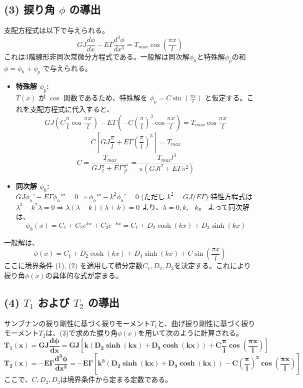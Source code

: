 \documentclass[a4j,12pt]{jsarticle}
\begin{document}
\subsection*{(3) 捩り角 $\phi$ の導出}
支配方程式は以下で与えられる。
$$GJ\frac{d\phi}{dx} - E\Gamma\frac{d^3\phi}{dx^3} = T_{max} \cos\left(\frac{\pi x}{l}\right)$$
これは3階線形非同次常微分方程式である。一般解は同次解$\phi_h$と特殊解$\phi_p$の和 $\phi = \phi_h + \phi_p$ で与えられる。
\begin{itemize}
    \item \textbf{特殊解 $\phi_p$:} \\
    $T(x)$ が $\cos$ 関数であるため、特殊解を $\phi_p = C \sin\left(\frac{\pi x}{l}\right)$ と仮定する。これを支配方程式に代入すると、
    $$GJ \left(C\frac{\pi}{l}\cos\frac{\pi x}{l}\right) - E\Gamma \left(-C\left(\frac{\pi}{l}\right)^3\cos\frac{\pi x}{l}\right) = T_{max}\cos\frac{\pi x}{l}$$
    $$C \left[ GJ\frac{\pi}{l} + E\Gamma\left(\frac{\pi}{l}\right)^3 \right] = T_{max}$$
    $$C = \frac{T_{max}}{GJ\frac{\pi}{l} + E\Gamma\frac{\pi^3}{l^3}} = \frac{T_{max} l^3}{\pi(GJl^2 + E\Gamma\pi^2)}$$

    \item \textbf{同次解 $\phi_h$:} \\
    $GJ\phi_h' - E\Gamma\phi_h''' = 0 \Rightarrow \phi_h''' - k^2 \phi_h' = 0$ (ただし $k^2 = GJ/E\Gamma$)
    特性方程式は $\lambda^3 - k^2\lambda = 0 \Rightarrow \lambda(\lambda-k)(\lambda+k)=0$ より、$\lambda = 0, k, -k$。
    よって同次解は、
    $$\phi_h(x) = C_1 + C_2 e^{kx} + C_3 e^{-kx} = C_1 + D_2 \cosh(kx) + D_3 \sinh(kx)$$
\end{itemize}
一般解は、
$$\phi(x) = C_1 + D_2 \cosh(kx) + D_3 \sinh(kx) + C \sin\left(\frac{\pi x}{l}\right)$$
ここに境界条件 (1), (2) を適用して積分定数$C_1, D_2, D_3$を決定する。これにより捩り角$\phi(x)$の具体的な式が定まる。

\subsection*{(4) $T_1$ および $T_2$ の導出}
サンブナンの捩り剛性に基づく捩りモーメント$T_1$と、曲げ捩り剛性に基づく捩りモーメント$T_2$は、(3)で求めた捩り角$\phi(x)$を用いて次のように計算される。
$$\boldsymbol{T_1(x) = GJ \frac{d\phi}{dx} = GJ \left[ k(D_2 \sinh(kx) + D_3 \cosh(kx)) + C \frac{\pi}{l} \cos\left(\frac{\pi x}{l}\right) \right]}$$
$$\boldsymbol{T_2(x) = -E\Gamma \frac{d^3\phi}{dx^3} = -E\Gamma \left[ k^3(D_2 \sinh(kx) + D_3 \cosh(kx)) - C \left(\frac{\pi}{l}\right)^3 \cos\left(\frac{\pi x}{l}\right) \right]}$$
ここで、$C, D_2, D_3$は境界条件から定まる定数である。
\end{document}
